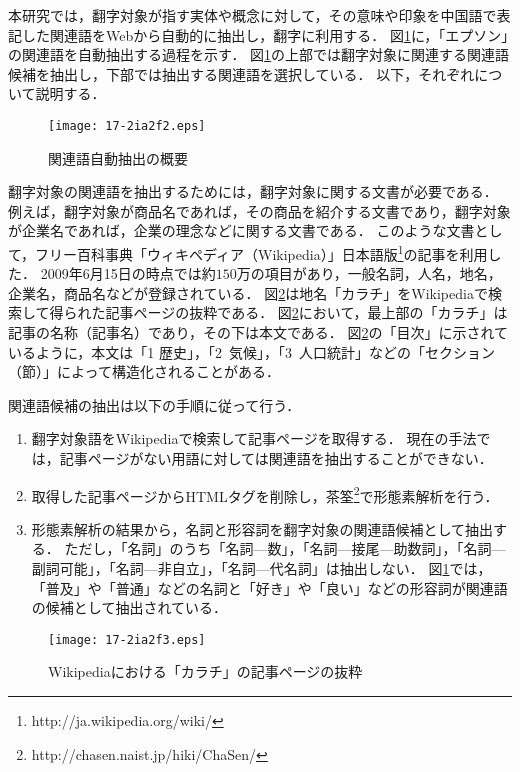 \documentclass[japanese]{jnlp_1.4}
\begin{document}
{本研究では，翻字対象が指す実体や概念に対して，その意味や印象を中国語で表記した関連語をWebから自動的に抽出し，翻字に利用する．
図\ref{fig:2}に，「エプソン」の関連語を自動抽出する過程を示す．
図\ref{fig:2}の上部では翻字対象に関連する関連語候補を抽出し，下部では抽出する関連語を選択している．
以下，それぞれについて説明する．

\begin{figure}[b]
\begin{center}
\texttt{[image: 17-2ia2f2.eps]}
\end{center}
 \caption{関連語自動抽出の概要}
 \label{fig:2}
\end{figure} 

翻字対象の関連語を抽出するためには，翻字対象に関する文書が必要である．
例えば，翻字対象が商品名であれば，その商品を紹介する文書であり，翻字対象が企業名であれば，企業の理念などに関する文書である．
このような文書として，フリー百科事典「ウィキペディア（Wikipedia）」日本語版\footnote{http://ja.wikipedia.org/wiki/}の記事を利用した．
2009年6月15日の時点では約$150$万の項目があり，一般名詞，人名，地名，企業名，商品名などが登録されている．
図{\ref{fig:karati}}は地名「カラチ」をWikipediaで検索して得られた記事ページの抜粋である．
図{\ref{fig:karati}}において，最上部の「カラチ」は記事の名称（記事名）であり，その下は本文である．
図{\ref{fig:karati}}の{\mbox{「目次」}}に示されているように，本文は「1 歴史」，{\mbox{「2 気候」}}，{\mbox{「3 人口統計」}}などの「セクション（節）」によって構造化されることがある．

関連語候補の抽出は以下の手順に従って行う．
\begin{enumerate}
\item 翻字対象語をWikipediaで検索して記事ページを取得する．
現在の手法では，記事ページがない用語に対しては関連語を抽出することができない．
\item 取得した記事ページからHTMLタグを削除し，茶筌\footnote{http://chasen.naist.jp/hiki/ChaSen/}で形態素解析を行う．
\item 形態素解析の結果から，名詞と形容詞を翻字対象の関連語候補として抽出する．
ただし，「名詞」のうち「名詞—数」，「名詞—接尾—助数詞」，「名詞—副詞可能」，「名詞—非自立」，「名詞—代名詞」は抽出しない． 
図\ref{fig:2}では，「普及」や「普通」などの名詞と「好き」や「良い」などの形容詞が関連語の候補として抽出されている．
\end{enumerate}

\begin{figure}[b]
\begin{center}
\texttt{[image: 17-2ia2f3.eps]}
\end{center}
 \caption{Wikipediaにおける「カラチ」の記事ページの抜粋}
 \label{fig:karati}
\end{figure}

}
\end{document}
